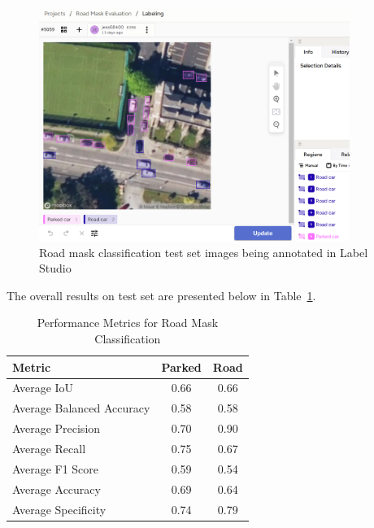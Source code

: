 \begin{figure}[htbp]
  \centering
  \includegraphics[width=0.9\textwidth]{images/label_studio4.png}
  \caption{Road mask classification test set images being annotated in Label Studio}
  \label{fig:LabelStudio_test_set}
\end{figure}

\newpage{}


The overall results on test set are presented below in Table~\ref{tab:metrics1}.

\begin{table}[htbp]
  \centering
  \begin{tabular}{|l|c|c|}
    
    \hline
    \textbf{Metric}           & \textbf{Parked} & \textbf{Road} \\ \hline
    Average IoU               & 0.66            & 0.66          \\ \hline
    Average Balanced Accuracy & 0.58            & 0.58          \\ \hline
    Average Precision         & 0.70            & 0.90          \\ \hline
    Average Recall            & 0.75            & 0.67          \\ \hline
    Average F1 Score          & 0.59            & 0.54          \\ \hline
    Average Accuracy          & 0.69            & 0.64          \\ \hline
    Average Specificity       & 0.74            & 0.79          \\ \hline
  \end{tabular}
  \caption{Performance Metrics for Road Mask Classification}
  \label{tab:metrics1}
\end{table}

